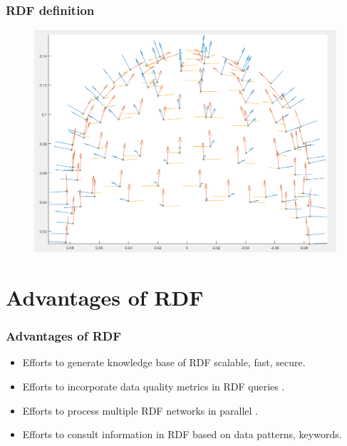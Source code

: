 \documentclass{beamer}
\numberwithin{figure}{section}
\numberwithin{equation}{section}
\begin{document}
\section{}
\begin{frame}
 \frametitle{RDF definition}
	\begin{figure}[p]
  		\centering
  		\includegraphics[width=0.6\linewidth]{pictures/opmvect}
  		\label{fig:approaches_RDF}
 	\end{figure}

  
\end{frame}

\section{Advantages of RDF}
\begin{frame}
 \frametitle{Advantages of RDF}
 \begin{itemize}
	\scriptsize
  	\item Efforts to generate knowledge base of RDF scalable, fast, secure\cite{Ren2018}.
    \vspace{2.5mm}
  	\item Efforts to incorporate data quality metrics in RDF queries \cite{Zneika2016}\cite{Cheng2012}\cite{Bursztyn2014}.
    \vspace{2.5mm}
  	\item  Efforts to process multiple RDF networks in parallel \cite{Doel2017}\cite{Kushwaha2015}.
    \vspace{2.5mm}
    \item  Efforts to consult information in RDF based on data patterns, keywords\cite{Kushwaha2015}.
 \end{itemize}
 
\end{frame}
\end{document}
